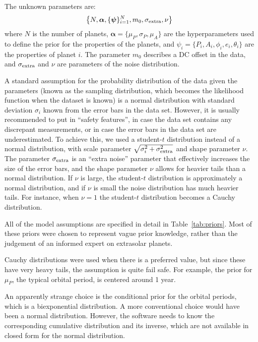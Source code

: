 \documentclass[useAMS,usenatbib]{mn2e}
\begin{document}
The unknown parameters are:
\begin{eqnarray}
\left\{N, \boldsymbol{\alpha}, \{\boldsymbol{\psi}\}_{i=1}^N, m_0, \sigma_{\rm extra}, \nu\right\}
\end{eqnarray}
where $N$ is the number of planets,
$\boldsymbol{\alpha} = \{\mu_P, \sigma_P, \mu_A\}$ are the
hyperparameters used to define the prior for the properties of the planets,
and $\psi_i = \{P_i, A_i, \phi_i, e_i, \theta_i\}$
are the properties of planet $i$.
The parameter $m_0$ describes a DC offset in the data, and
$\sigma_{\rm extra}$ and $\nu$ are parameters of the noise distribution.

A standard assumption for the probability distribution of the data given the
parameters (known as the sampling distribution, which becomes the likelihood
function when the dataset is known) is a normal distribution with
standard deviation $\sigma_i$ known from the error bars in the data set.
However, it is usually recommended to put in ``safety features'', in case the
data set contains any discrepant measurements, or in case the error bars in the
data set are underestimated. To achieve this, we used a student-$t$ distribution
instead of a normal distribution, with
scale parameter $\sqrt{\sigma_i^2 + \sigma_{\rm extra}^2}$ and shape parameter $\nu$. The
parameter $\sigma_{\rm extra}$ is an ``extra noise'' parameter that effectively increases the
size of the error bars, and the shape parameter $\nu$ allows for heavier tails
than a normal distribution. If $\nu$ is large, the student-$t$ distribution
is approximately a normal distribution, and if $\nu$ is small the noise
distribution has much heavier tails. For instance, when $\nu=1$ the student-$t$
distribution becomes a Cauchy distribution.

All of the model assumptions are specified in detail in
Table~\ref{tab:priors}. Most of these priors were chosen to represent vague
prior knowledge, rather than the judgement of an informed expert on extrasolar
planets.

Cauchy distributions were used when there is a
preferred value, but since these have very heavy tails, the assumption is
quite fail safe. For example, the prior for $\mu_P$, the typical orbital period,
is centered around 1 year.

An apparently strange choice is the conditional prior for the orbital
periods, which is a biexponential distribution. A more conventional choice
would have been a normal distribution. However, the \citet{rjobject} software
needs to know the corresponding cumulative distribution and its inverse, which
are not available in closed form for the normal distribution.
\end{document}

